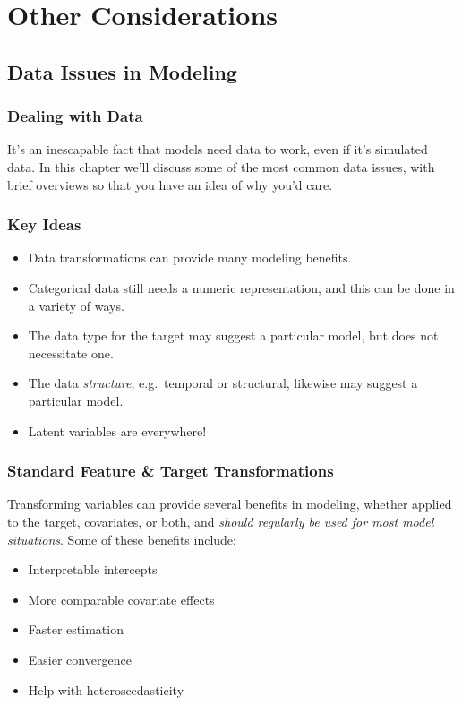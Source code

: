 \documentclass[
  letterpaper,
]{krantz}
\providecommand{\tightlist}{%
  \setlength{\itemsep}{0pt}\setlength{\parskip}{0pt}}\usepackage{longtable,booktabs,array}
\begin{document}
\part{Other Considerations}

\chapter{Data Issues in Modeling}\label{sec-data}

\section{Dealing with Data}\label{dealing-with-data}

It's an inescapable fact that models need data to work, even if it's
simulated data. In this chapter we'll discuss some of the most common
data issues, with brief overviews so that you have an idea of why you'd
care.

\section{Key Ideas}\label{key-ideas-4}

\begin{itemize}
\tightlist
\item
  Data transformations can provide many modeling benefits.
\item
  Categorical data still needs a numeric representation, and this can be
  done in a variety of ways.
\item
  The data type for the target may suggest a particular model, but does
  not necessitate one.
\item
  The data \emph{structure}, e.g.~temporal or structural, likewise may
  suggest a particular model.
\item
  Latent variables are everywhere!
\end{itemize}

\section{Standard Feature \& Target
Transformations}\label{sec-data-transfromations}

Transforming variables can provide several benefits in modeling, whether
applied to the target, covariates, or both, and \emph{should regularly
be used for most model situations}. Some of these benefits include:

\begin{itemize}
\tightlist
\item
  Interpretable intercepts
\item
  More comparable covariate effects
\item
  Faster estimation
\item
  Easier convergence
\item
  Help with heteroscedasticity
\end{itemize}
\end{document}

